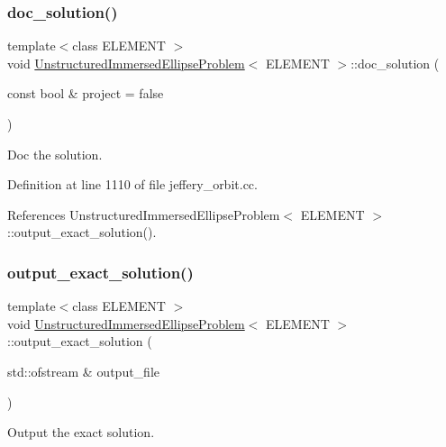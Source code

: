 \subsubsection{\texorpdfstring{doc\+\_\+solution()}{doc\_solution()}}
{\footnotesize\ttfamily template$<$class E\+L\+E\+M\+E\+NT $>$ \\
void \hyperlink{classUnstructuredImmersedEllipseProblem}{Unstructured\+Immersed\+Ellipse\+Problem}$<$ E\+L\+E\+M\+E\+NT $>$\+::doc\+\_\+solution (\begin{DoxyParamCaption}\item[{const bool \&}]{project = {\ttfamily false} }\end{DoxyParamCaption})}



Doc the solution. 



Definition at line 1110 of file jeffery\+\_\+orbit.\+cc.



References Unstructured\+Immersed\+Ellipse\+Problem$<$ E\+L\+E\+M\+E\+N\+T $>$\+::output\+\_\+exact\+\_\+solution().

\mbox{\label{classUnstructuredImmersedEllipseProblem_a29a232dfac18ea901332bebdc14fad15}} 
\subsubsection{\texorpdfstring{output\+\_\+exact\+\_\+solution()}{output\_exact\_solution()}}
{\footnotesize\ttfamily template$<$class E\+L\+E\+M\+E\+NT $>$ \\
void \hyperlink{classUnstructuredImmersedEllipseProblem}{Unstructured\+Immersed\+Ellipse\+Problem}$<$ E\+L\+E\+M\+E\+NT $>$\+::output\+\_\+exact\+\_\+solution (\begin{DoxyParamCaption}\item[{std\+::ofstream \&}]{output\+\_\+file }\end{DoxyParamCaption})}



Output the exact solution. 




